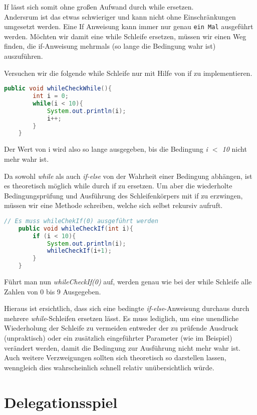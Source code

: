 \documentclass{pi1}
\begin{document}
If lässt sich somit ohne großen Aufwand durch while ersetzen.\\
Andersrum ist das etwas schwieriger und kann nicht ohne Einschränkungen umgesetzt werden. Eine If Anweisung kann immer nur genau \texttt{ein Mal} ausgeführt werden. Möchten wir damit eine while Schleife ersetzen, müssen wir einen Weg finden, die if-Anweisung mehrmals (so lange die Bedingung wahr ist) auszuführen.

Versuchen wir die folgende while Schleife nur mit Hilfe von if zu implementieren.

\begin{lstlisting}[caption={}, firstnumber=1, language=Java]
 public void whileCheckWhile(){
        int i = 0;
        while(i < 10){
            System.out.println(i);
            i++;
        }
    }
\end{lstlisting}

Der Wert von i wird also so lange ausgegeben, bis die Bedingung \emph{i $<$ 10} nicht mehr wahr ist.

Da sowohl \emph{while} als auch \emph{if-else} von der Wahrheit einer Bedingung abhängen, ist es theoretisch möglich while durch if zu ersetzen. Um aber die wiederholte Bedingungsprüfung und Ausführung des Schleifenkörpers mit if zu erzwingen, müssen wir eine Methode schreiben, welche sich selbst rekursiv aufruft.

\begin{lstlisting}[caption={}, firstnumber=1, language=Java]
// Es muss whileChekIf(0) ausgeführt werden
    public void whileCheckIf(int i){
        if (i < 10){
            System.out.println(i);
            whileCheckIf(i+1);
        }
    }
\end{lstlisting}

Führt man nun \emph{whileCheckIf(0)} auf, werden genau wie bei der while Schleife alle Zahlen von 0 bis 9 Ausgegeben.

Hieraus ist ersichtlich, dass sich eine bedingte \emph{if-else}-Anweisung durchaus durch mehrere \emph{while}-Schleifen ersetzen lässt. Es muss lediglich, um eine unendliche Wiederholung der Schleife zu vermeiden entweder der zu prüfende Ausdruck (unpraktisch) oder ein zusätzlich eingeführter Parameter (wie im Beispiel) verändert werden, damit die Bedingung zur Ausführung nicht mehr wahr ist. Auch weitere Verzweigungen sollten sich theoretisch so darstellen lassen, wenngleich dies wahrscheinlich schnell relativ unübersichtlich würde.


\section{Delegationsspiel}
\end{document}
